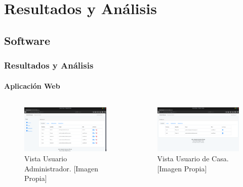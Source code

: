 \section{Resultados y Análisis}
\subsection{Software}
\begin{frame}[t]
\frametitle{Resultados y Análisis}
\framesubtitle{Aplicación Web}
\begin{columns}[t]
	\begin{figure}[!]
		\centering
		\caption{Vista Usuario Administrador. [Imagen Propia]}
		\label{fig:adminview}
		\includegraphics[width=\linewidth]{Imagenes/Admin_view}
	\end{figure}
	
	\begin{figure}[!]
		\centering
		\caption{Vista Usuario de Casa. [Imagen Propia]}
		\label{fig:houseview}
		\includegraphics[width=\linewidth]{Imagenes/UserH_view}
	\end{figure}

\end{columns}
\end{frame}

